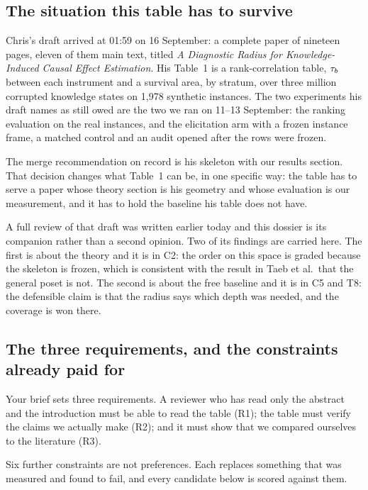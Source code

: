 \subsection{The situation this table has to survive}

Chris's draft arrived at 01:59 on 16 September: a complete paper of nineteen pages, eleven of them
main text, titled \emph{A Diagnostic Radius for Knowledge-Induced Causal Effect Estimation}. His
Table~1 is a rank-correlation table, $\tau_{b}$ between each instrument and a survival area, by
stratum, over three million corrupted knowledge states on 1{,}978 synthetic instances. The two
experiments his draft names as still owed are the two we ran on 11--13 September: the ranking
evaluation on the real instances, and the elicitation arm with a frozen instance frame, a matched
control and an audit opened after the rows were frozen.

The merge recommendation on record is his skeleton with our results section. That decision changes
what Table~1 can be, in one specific way: the table has to serve a paper whose theory section is
his geometry and whose evaluation is our measurement, and it has to hold the baseline his table
does not have.

A full review of that draft was written earlier today and this dossier is its companion rather than
a second opinion. Two of its findings are carried here. The first is about the theory and it is in
C2: the order on this space is graded because the skeleton is frozen, which is consistent with the
result in Taeb et al.\ that the general poset is not. The second is about the free baseline and it
is in C5 and T8: the defensible claim is that the radius says which depth was needed, and the
coverage is won there.

\subsection{The three requirements, and the constraints already paid for}

Your brief sets three requirements. A reviewer who has read only the abstract and the introduction
must be able to read the table (R1); the table must verify the claims we actually make (R2); and
it must show that we compared ourselves to the literature (R3).

Six further constraints are not preferences. Each replaces something that was measured and found
to fail, and every candidate below is scored against them.

